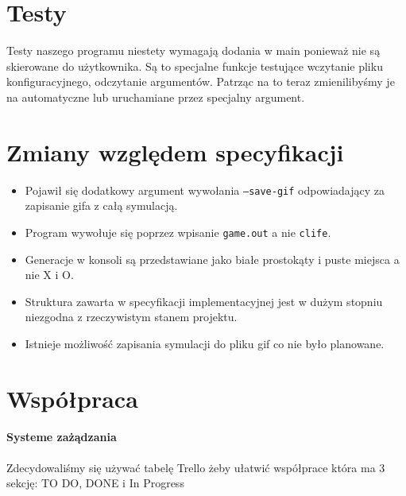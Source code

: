\documentclass[12pt]{article}
\begin{document}
\section{Testy}
Testy naszego programu niestety wymagają dodania w main ponieważ nie są skierowane do użytkownika.
Są to specjalne funkcje testujące wczytanie pliku konfiguracyjnego, odczytanie argumentów.
Patrząc na to teraz zmienilibyśmy je na automatyczne lub uruchamiane przez specjalny argument.

\section{Zmiany względem specyfikacji}
\begin{itemize}
\item
Pojawił się dodatkowy  argument wywołania \texttt{--save-gif} odpowiadający za zapisanie gifa z całą symulacją.

\item
Program wywołuje się poprzez wpisanie \texttt{game.out} a nie \texttt{clife}.

\item
Generacje w konsoli są przedstawiane jako białe prostokąty i puste miejsca a nie X i O.

\item
Struktura zawarta w specyfikacji implementacyjnej jest w dużym stopniu niezgodna z rzeczywistym stanem projektu.

\item
Istnieje możliwość zapisania symulacji do pliku gif co nie było planowane.
\end{itemize}

\section{Współpraca}
\paragraph{Systeme zażądzania}
    Zdecydowaliśmy się używać tabelę Trello żeby ułatwić współprace która ma 3 sekcję: TO DO, DONE i In Progress
\end{document}
